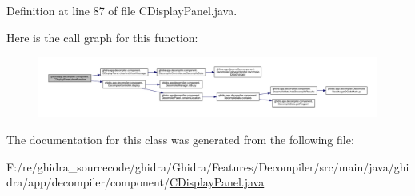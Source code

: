 Definition at line 87 of file C\+Display\+Panel.\+java.

Here is the call graph for this function\+:
\nopagebreak
\begin{figure}[H]
\begin{center}
\leavevmode
\includegraphics[width=350pt]{classghidra_1_1app_1_1decompiler_1_1component_1_1_c_display_panel_a62c4b0dc99331e02765f481131db23b2_cgraph}
\end{center}
\end{figure}


The documentation for this class was generated from the following file\+:\begin{DoxyCompactItemize}
\item 
F\+:/re/ghidra\+\_\+sourcecode/ghidra/\+Ghidra/\+Features/\+Decompiler/src/main/java/ghidra/app/decompiler/component/\mbox{\hyperlink{_c_display_panel_8java}{C\+Display\+Panel.\+java}}\end{DoxyCompactItemize}

